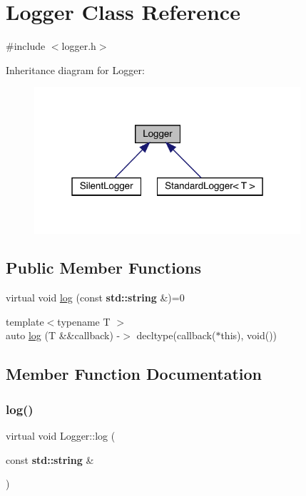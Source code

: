 \hypertarget{class_logger}{}\section{Logger Class Reference}
\label{class_logger}


{\ttfamily \#include $<$logger.\+h$>$}



Inheritance diagram for Logger\+:\nopagebreak
\begin{figure}[H]
\begin{center}
\leavevmode
\includegraphics[width=280pt]{class_logger__inherit__graph}
\end{center}
\end{figure}
\subsection*{Public Member Functions}
\begin{DoxyCompactItemize}
\item 
virtual void \hyperlink{class_logger_a20f6e95efb1eab08269484d8745feb65}{log} (const \textbf{ std\+::string} \&)=0
\item 
{\footnotesize template$<$typename T $>$ }\\auto \hyperlink{class_logger_a7ea8858bb20cc869f5e6644c682292d7}{log} (T \&\&callback) -\/$>$ decltype(callback($\ast$this), void())
\end{DoxyCompactItemize}


\subsection{Member Function Documentation}
\mbox{\label{class_logger_a20f6e95efb1eab08269484d8745feb65}} 
\subsubsection{\texorpdfstring{log()}{log()}\hspace{0.1cm}{\footnotesize\ttfamily [1/2]}}
{\footnotesize\ttfamily virtual void Logger\+::log (\begin{DoxyParamCaption}\item[{const \textbf{ std\+::string} \&}]{ }\end{DoxyParamCaption})\hspace{0.3cm}{\ttfamily [pure virtual]}}



